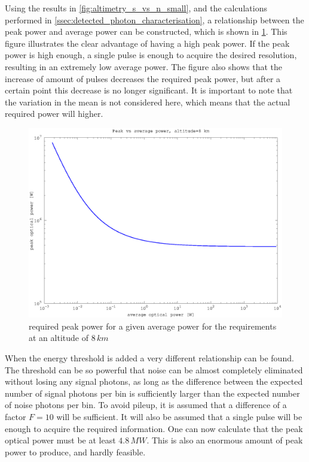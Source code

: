 Using the results in \cref{fig:altimetry_s_vs_n_small}, and the calculations performed in \cref{ssec:detected_photon_characterisation}, a relationship between the peak power and average power can be constructed, which is shown in \cref{fig:peak_vs_av}. This figure illustrates the clear advantage of having a high peak power. If the peak power is high enough, a single pulse is enough to acquire the desired resolution, resulting in an extremely low average power. The figure also shows that the increase of amount of pulses decreases the required peak power, but after a certain point this decrease is no longer significant. It is important to note that the variation in the mean is not considered here, which means that the actual required power will higher.

\begin{figure}[h]
\centering
	\includegraphics[width=0.8\linewidth]{fig/peak_vs_av.eps}
\caption{required peak power for a given average power for the requirements at an altitude of $8\,km$}
\label{fig:peak_vs_av}
\end{figure}

When the energy threshold is added a very different relationship can be found. The threshold can be so powerful that noise can be almost completely eliminated without losing any signal photons, as long as the difference between the expected number of signal photons per bin is sufficiently larger than the expected number of noise photons per bin. To avoid pileup, it is assumed that a difference of a factor $F=10$ will be sufficient. It will also be assumed that a single pulse will be enough to acquire the required information. One can now calculate that the peak optical power must be at least $4.8\,MW$. This is also an enormous amount of peak power to produce, and hardly feasible.

